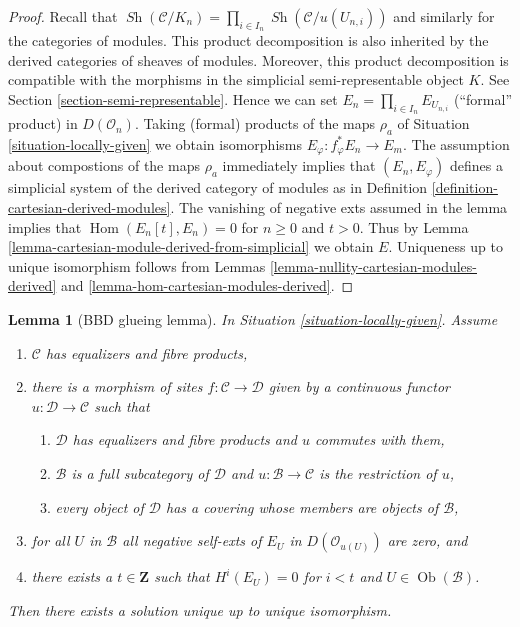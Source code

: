 \documentclass{stacks-project}
\theoremstyle{plain}
\newtheorem{lemma}[subsection]{Lemma}
\theoremstyle{definition}
\theoremstyle{remark}
\numberwithin{equation}{subsection}
\def\Hom{\mathop{\mathrm{Hom}}\nolimits}
\def\Ob{\mathop{\mathrm{Ob}}\nolimits}
\def\Sh{\mathop{\mathit{Sh}}\nolimits}
\begin{document}
\begin{proof}
Recall that
$\Sh(\mathcal{C}/K_n) = \prod_{i \in I_n} \Sh(\mathcal{C}/u(U_{n, i}))$
and similarly for the categories of modules. This product decomposition
is also inherited by the derived categories of sheaves of modules.
Moreover, this product decomposition is compatible with
the morphisms in the simplicial semi-representable object $K$.
See Section \ref{section-semi-representable}.
Hence we can set $E_n = \prod_{i \in I_n} E_{U_{n, i}}$
(``formal'' product) in $D(\mathcal{O}_n)$.
Taking (formal) products of the maps $\rho_a$ of
Situation \ref{situation-locally-given}
we obtain isomorphisms $E_\varphi : f_\varphi^*E_n \to E_m$.
The assumption about compostions of the maps $\rho_a$
immediately implies that $(E_n, E_\varphi)$
defines a simplicial system of the derived category of modules
as in Definition \ref{definition-cartesian-derived-modules}.
The vanishing of negative exts assumed in the lemma implies that
$\Hom(E_n[t], E_n) = 0$ for $n \geq 0$ and $t > 0$.
Thus by
Lemma \ref{lemma-cartesian-module-derived-from-simplicial}
we obtain $E$.
Uniqueness up to unique isomorphism follows from
Lemmas \ref{lemma-nullity-cartesian-modules-derived} and
\ref{lemma-hom-cartesian-modules-derived}.
\end{proof}

\begin{lemma}[BBD glueing lemma]
\label{lemma-bbd-glueing}
In Situation \ref{situation-locally-given}. Assume
\begin{enumerate}
\item $\mathcal{C}$ has equalizers and fibre products,
\item there is a morphism of sites $f : \mathcal{C} \to \mathcal{D}$
given by a continuous functor $u : \mathcal{D} \to \mathcal{C}$
such that
\begin{enumerate}
\item $\mathcal{D}$ has equalizers and fibre products and $u$
commutes with them,
\item $\mathcal{B}$ is a full subcategory of $\mathcal{D}$
and $u : \mathcal{B} \to \mathcal{C}$ is the restriction of $u$,
\item every object of $\mathcal{D}$ has a covering whose members
are objects of $\mathcal{B}$,
\end{enumerate}
\item for all $U$ in $\mathcal{B}$ all negative self-exts of $E_U$
in $D(\mathcal{O}_{u(U)})$ are zero, and
\item there exists a $t \in \mathbf{Z}$ such that $H^i(E_U) = 0$ for $i < t$
and $U \in \Ob(\mathcal{B})$.
\end{enumerate}
Then there exists a solution unique up to unique isomorphism.
\end{lemma}
\end{document}
